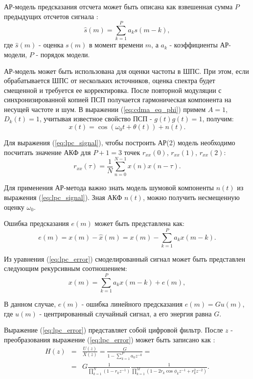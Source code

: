 АР-модель предсказания отсчета может быть описана как взвешенная сумма ${P}$ предыдущих отсчетов сигнала \cite{marpl_book}:
\begin{equation}
	\label{eq:lpc_forecast}
	\hat{s}(m) = \sum \limits_{k=1}^P a_k s(m-k),
\end{equation}
где ${\hat{s}(m)}$ - оценка ${s(m)}$ в момент времени ${m}$, а ${a_k}$ - коэффициенты АР-модели, ${P}$ - порядок модели.

АР-модель может быть использована для оценки частоты в ШПС. При этом, если обрабатывается ШПС от нескольких источников,
оценка спектра будет смещенной и требуется ее корректировка. После повторной модуляции
с синхронизированной копией ПСП получается гармоническая компонента на несущей частоте и шум. 
В выражении (\ref{eq:cdma_eq_phi}) примем ${A = 1}$, ${D_k(t)=1}$, учитывая известное свойство ПСП - ${g(t)g(t)=1}$, получим:
\begin{equation}
	\label{eq:lpc_signal}
	x(t) = \cos(\omega_{0}t + \theta(t)) + n(t).
\end{equation}

Для выражения (\ref{eq:lpc_signal}), чтобы построить АР(2) модель необходимо посчитать значение АКФ для ${P + 1 = 3}$ точек
${r_{xx}(0)}$, ${r_{xx}(1)}$, ${r_{xx}(2)}$:
\begin{equation}
	\label{eq:lpc_cov}
	{r_{xx}(\tau) = \frac{1}{N} \sum \limits_{n=0}^{N-1} x(n) x(n-\tau)}.
\end{equation}

Для применения АР-метода важно знать модель шумовой компоненты ${n(t)}$ из выражения
(\ref{eq:lpc_signal}). Зная АКФ ${n(t)}$, можно получить несмещенную оценку ${\omega_0}$.

Ошибка предсказания ${e(m)}$ может быть представлена как:
\begin{equation}
	\label{eq:lpc_error}
	e(m) = x(m) - \hat{x}(m) = x(m) - \sum \limits_{k=1}^P a_k x(m-k).
\end{equation}

Из уравнения (\ref{eq:lpc_error}) смоделированный сигнал может быть представлен следующим рекурсивным соотношением:
\begin{equation}
	\label{eq:lpc_signal_from_ar}
	x(m) = \sum \limits_{k=1}^P a_k x(m-k) + e(m),
\end{equation}

В данном случае, ${e(m)}$ - ошибка линейного предсказания ${e(m) = Gu(m)}$, где ${u(m)}$ - центрированный случайный сигнал, а его энергия равна ${G}$.

Выражение (\ref{eq:lpc_error}) представляет собой цифровой фильтр.
После ${z}$ - преобразования выражение (\ref{eq:lpc_error}) может быть записано как \cite{saeed_book}:
\begin{eqnarray}
	\label{eq:lpc_z}
		H(z)	& = & \frac{U(z)}{X(z)} = \frac{G}{1 - \sum \limits_{k=1}^P a_kz^{-k}} =  \nonumber \\
			& = & G\frac{1}{\prod \limits_{k=1}^N (1-r_kz^{-1})} \frac{1}{\prod \limits_{k=1}^M (1-2r_k \cos \phi_k z^{-1} + r_k^2z^{-2})}.
\end{eqnarray}

